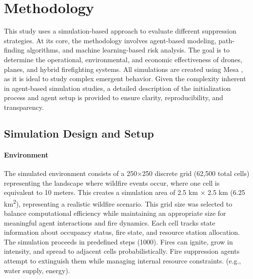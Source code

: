 \documentclass[11pt, a4paper]{article}
\begin{document}
\section{Methodology}
\label{sec:Methodology}

This study uses a simulation-based approach to evaluate different suppression strategies. At its core, the methodology involves agent-based modeling, path-finding algorithms, and machine learning-based risk analysis. The goal is to determine the operational, environmental, and economic effectiveness of drones, planes, and hybrid firefighting systems. All simulations are created using Mesa \citep{terMesa}, as it is ideal to study complex emergent behavior. Given the complexity inherent in agent-based simulation studies, a detailed description of the initialization process and agent setup is provided to ensure clarity, reproducibility, and transparency.

\subsection{Simulation Design and Setup}
\paragraph{Environment} The simulated environment consists of a 250×250 discrete grid (62,500 total cells) representing the landscape where wildfire events occur, where one cell is equivalent to 10 meters. This creates a simulation area of 2.5 km × 2.5 km (6.25 km\textsuperscript{2}), representing a realistic wildfire scenario. This grid size was selected to balance computational efficiency while maintaining an appropriate size for meaningful agent interactions and fire dynamics. Each cell tracks state information about occupancy status, fire state, and resource station allocation. The simulation proceeds in predefined steps (1000). Fires can ignite, grow in intensity, and spread to adjacent cells probabilistically. Fire suppression agents attempt to extinguish them while managing internal resource constraints. (e.g., water supply, energy). 
\end{document}
